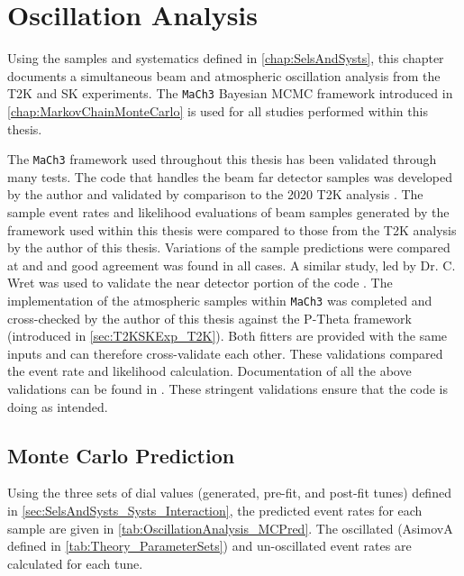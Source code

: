 \chapter{Oscillation Analysis}
\label{chap:OscillationAnalysis}

Using the samples and systematics defined in \autoref{chap:SelsAndSysts}, this chapter documents a simultaneous beam and atmospheric oscillation analysis from the T2K and SK experiments. The \texttt{MaCh3} Bayesian MCMC framework introduced in \autoref{chap:MarkovChainMonteCarlo} is used for all studies performed within this thesis.

The \texttt{MaCh3} framework used throughout this thesis has been validated through many tests. The code that handles the beam far detector samples was developed by the author and validated by comparison to the 2020 T2K analysis \cite{Dunne2020-uf}. The sample event rates and likelihood evaluations of beam samples generated by the framework used within this thesis were compared to those from the T2K analysis by the author of this thesis. Variations of the sample predictions were compared at \quickmath{\pm 1 \sigma} and \quickmath{\pm 3 \sigma} and good agreement was found in all cases. A similar study, led by Dr. C. Wret was used to validate the near detector portion of the code \cite{t2k_tn_426}. The implementation of the atmospheric samples within \texttt{MaCh3} was completed and cross-checked by the author of this thesis against the P-Theta framework (introduced in \autoref{sec:T2KSKExp_T2K}). Both fitters are provided with the same inputs and can therefore cross-validate each other. These validations compared the event rate and likelihood calculation. Documentation of all the above validations can be found in \cite{t2k_tn_426}. These stringent validations ensure that the code is doing as intended.

\section{Monte Carlo Prediction}
\label{sec:OscillationAnalysis_MonteCarloPred}

Using the three sets of dial values (generated, pre-fit, and post-fit tunes) defined in \autoref{sec:SelsAndSysts_Systs_Interaction}, the predicted event rates for each sample are given in \autoref{tab:OscillationAnalysis_MCPred}. %
The oscillated (AsimovA defined in \autoref{tab:Theory_ParameterSets}) and un-oscillated event rates are calculated for each tune.

